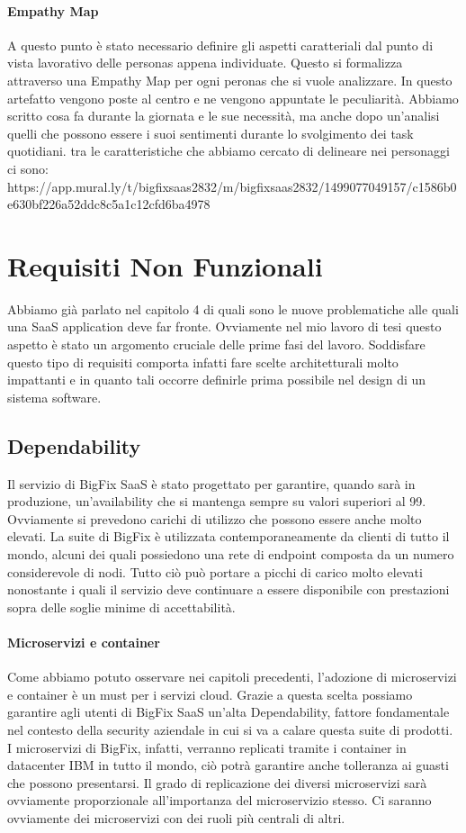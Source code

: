 \paragraph{Empathy Map}
A questo punto è stato necessario definire gli aspetti caratteriali dal punto di vista lavorativo delle personas appena individuate. Questo si formalizza attraverso una Empathy Map per ogni peronas che si vuole analizzare. In questo artefatto vengono poste al centro e ne vengono appuntate le peculiarità. Abbiamo scritto cosa fa durante la giornata e le sue necessità, ma anche dopo un'analisi quelli che possono essere i suoi sentimenti durante lo svolgimento dei task quotidiani. tra le caratteristiche che abbiamo cercato di delineare nei personaggi ci sono:
https://app.mural.ly/t/bigfixsaas2832/m/bigfixsaas2832/1499077049157/c1586b0e630bf226a52ddc8c5a1c12cfd6ba4978

\section{Requisiti Non Funzionali}
Abbiamo già parlato nel capitolo 4 di quali sono le nuove problematiche alle quali una SaaS application deve far fronte. Ovviamente nel mio lavoro di tesi questo aspetto è stato un argomento cruciale delle prime fasi del lavoro. Soddisfare questo tipo di requisiti comporta infatti fare scelte architetturali molto impattanti e in quanto tali occorre definirle prima possibile nel design di un sistema software. 

\subsection{Dependability}
Il servizio di BigFix SaaS è stato progettato per garantire, quando sarà in produzione, un'availability che si mantenga sempre su valori superiori al 99. Ovviamente si prevedono carichi di utilizzo che possono essere anche molto elevati. La suite di BigFix è utilizzata contemporaneamente da clienti di tutto il mondo, alcuni dei quali possiedono una rete di endpoint composta da un numero considerevole di nodi. Tutto ciò può portare a picchi di carico molto elevati nonostante i quali il servizio deve continuare a essere disponibile con prestazioni sopra delle soglie minime di accettabilità.

\paragraph{Microservizi e container}
Come abbiamo potuto osservare nei capitoli precedenti, l'adozione di microservizi e container è un must per i servizi cloud. Grazie a questa scelta possiamo garantire agli utenti di BigFix SaaS un'alta Dependability, fattore fondamentale nel contesto della security aziendale in cui si va a calare questa suite di prodotti. I microservizi di BigFix, infatti, verranno replicati tramite i container in datacenter IBM in tutto il mondo, ciò potrà garantire anche tolleranza ai guasti che possono presentarsi. Il grado di replicazione dei diversi microservizi sarà ovviamente proporzionale all'importanza del microservizio stesso. Ci saranno ovviamente dei microservizi con dei ruoli più centrali di altri.

